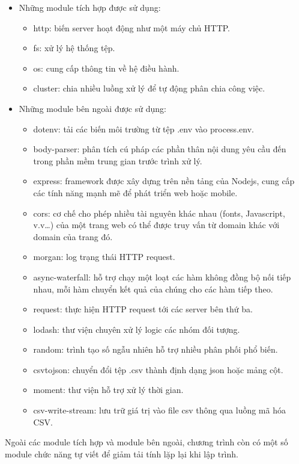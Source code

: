 \begin{itemize}
    \item Những module tích hợp được sử dụng:
    \begin{itemize}
        \item http: biến server hoạt động như một máy chủ HTTP.
        \item fs: xử lý hệ thống tệp.
        \item os: cung cấp thông tin về hệ điều hành.
        \item cluster: chia nhiều luồng xử lý để tự động phân chia công việc.
    \end{itemize}
    \item Những module bên ngoài được sử dụng:
    \begin{itemize}
        \item dotenv: tải các biến môi trường từ tệp .env vào process.env.
        \item body-parser: phân tích cú pháp các phần thân nội dung yêu cầu đến trong phần mềm trung gian trước trình xử lý.
        \item express: framework được xây dựng trên nền tảng của Nodejs, cung cấp các tính năng mạnh mẽ để phát triển web hoặc mobile.
        \item cors: cơ chế cho phép nhiều tài nguyên khác nhau (fonts, Javascript, v.v…) của một trang web có thể được truy vấn từ domain khác với domain của trang đó.
        \item morgan: log trạng thái HTTP request.
        \item async-waterfall: hỗ trợ chạy một loạt các hàm không đồng bộ nối tiếp nhau, mỗi hàm chuyển kết quả của chúng cho các hàm tiếp theo.
        \item request: thực hiện HTTP request tới các server bên thứ ba.
        \item lodash: thư viện chuyên xử lý logic các nhóm đối tượng.
        \item random: trình tạo số ngẫu nhiên hỗ trợ nhiều phân phối phổ biến.
        \item csvtojson: chuyển đổi tệp .csv thành định dạng json hoặc mảng cột.
        \item moment: thư viện hỗ trợ xử lý thời gian.
        \item csv-write-stream: lưu trữ giá trị vào file csv thông qua luồng mã hóa CSV.
    \end{itemize}
\end{itemize}

Ngoài các module tích hợp và module bên ngoài, chương trình còn có một số module chức năng tự viết để giảm tải tính lặp lại khi lập trình.

